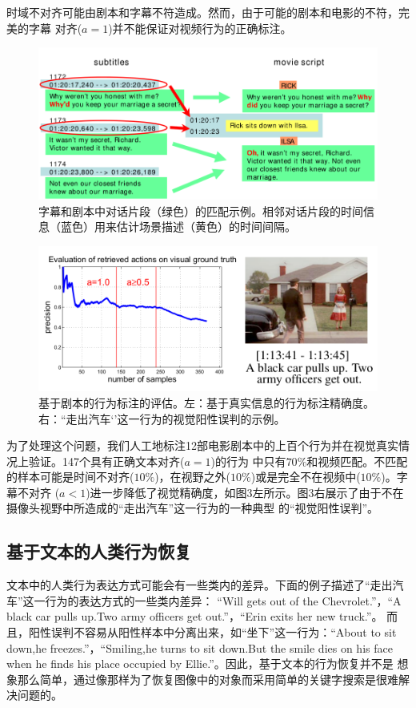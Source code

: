 \documentclass[10pt,twocolumn,letterpaper]{article}
\begin{document}
时域不对齐可能由剧本和字幕不符造成。然而，由于可能的剧本和电影的不符，完美的字幕
对齐($a = 1$)并不能保证对视频行为的正确标注。

\begin{figure}[t]
\begin{center}
   \includegraphics[width=1.0\linewidth]{fig2.png}
\end{center}
   \caption{
		   字幕和剧本中对话片段（绿色）的匹配示例。相邻对话片段的时间信息（蓝色）用来估计场景描述（黄色）的时间间隔。
   }
\end{figure}
\begin{figure}[h]
\begin{center}
   \includegraphics[width=1.0\linewidth]{fig3.png}
\end{center}
   \caption{
		   基于剧本的行为标注的评估。左：基于真实信息的行为标注精确度。右：``走出汽车‘’这一行为的视觉阳性误判的示例。
   }
\end{figure}

为了处理这个问题，我们人工地标注12部电影剧本中的上百个行为并在视觉真实情况上验证。147个具有正确文本对齐($a = 1$)的行为
中只有$70\%$和视频匹配。不匹配的样本可能是时间不对齐($10\%$)，在视野之外($10\%$)或是完全不在视频中($10\%$)。字幕不对齐
($a < 1$)进一步降低了视觉精确度，如图3左所示。图3右展示了由于不在摄像头视野中所造成的``走出汽车''这一行为的一种典型
的``视觉阳性误判''。

\subsection{基于文本的人类行为恢复}
文本中的人类行为表达方式可能会有一些类内的差异。下面的例子描述了``走出汽车''这一行为的表达方式的一些类内差异：
``Will gets out of the Chevrolet.''，``A black car pulls up.Two army officers get out.''，``Erin exits her new truck.''。
而且，阳性误判不容易从阳性样本中分离出来，如``坐下''这一行为：``About to sit down,he freezes.''，``Smiling,he turns to 
sit down.But the smile dies on his face when he finds his place occupied by Ellie.''。因此，基于文本的行为恢复并不是
想象那么简单，通过像\cite{14}那样为了恢复图像中的对象而采用简单的关键字搜索是很难解决问题的。
\end{document}
